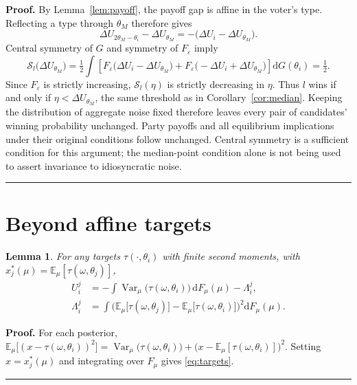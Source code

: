 \documentclass[12pt,letterpaper]{article}
\newtheorem{lemma}{Lemma}
\newenvironment{proof}[1][Proof]{\noindent\textbf{#1.} }{\ \rule{0.5em}{0.5em}}
\begin{document}
\begin{proof}
By Lemma~\ref{lem:payoff}, the payoff gap is affine in the voter's type. Reflecting a type through $\theta_M$ therefore gives
\[
\Delta U_{2\theta_M-\theta_i}-\Delta U_{\theta_M}
=-\big(\Delta U_i-\Delta U_{\theta_M}\big).
\]
Central symmetry of $G$ and symmetry of $F_\varepsilon$ imply
\[
\mathcal S_l\big(\Delta U_{\theta_M}\big)
=\tfrac12\int\left[F_\varepsilon\big(\Delta U_i-\Delta U_{\theta_M}\big)
+F_\varepsilon\big(-\Delta U_i+\Delta U_{\theta_M}\big)\right]\mathrm{d}G(\theta_i)
=\tfrac12.
\]
Since $F_\varepsilon$ is strictly increasing, $\mathcal S_l(\eta)$ is strictly decreasing in $\eta$. Thus $l$ wins if and only if $\eta<\Delta U_{\theta_M}$, the same threshold as in Corollary~\ref{cor:median}. Keeping the distribution of aggregate noise fixed therefore leaves every pair of candidates' winning probability unchanged. Party payoffs and all equilibrium implications under their original conditions follow unchanged. Central symmetry is a sufficient condition for this argument; the median-point condition alone is not being used to assert invariance to idiosyncratic noise.
\end{proof}

\section{Beyond affine targets}

\begin{lemma}\label{lem:targets}
For any targets $\tau(\cdot,\theta_i)$ with finite second moments, with $x^*_j(\mu)=\mathbb{E}_\mu[\tau(\omega,\theta_j)]$,
\begin{align}
U_i^j&=-\int\operatorname{Var}_\mu\big(\tau(\omega,\theta_i)\big)\,\mathrm{d}F_\mu(\mu)-\Lambda_i^j,\label{eq:targets}\\
\Lambda_i^j&=\int\Big(\mathbb{E}_\mu\big[\tau(\omega,\theta_j)\big]-\mathbb{E}_\mu\big[\tau(\omega,\theta_i)\big]\Big)^2\mathrm{d}F_\mu(\mu).\nonumber
\end{align}
\end{lemma}

\begin{proof}
For each posterior, $\mathbb{E}_\mu\big[(x-\tau(\omega,\theta_i))^2\big]=\operatorname{Var}_\mu\big(\tau(\omega,\theta_i)\big)+\big(x-\mathbb{E}_\mu[\tau(\omega,\theta_i)]\big)^2$. Setting $x=x^*_j(\mu)$ and integrating over $F_\mu$ gives \eqref{eq:targets}.
\end{proof}
\end{document}
